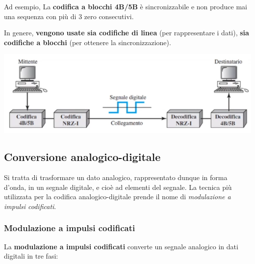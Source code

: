             Ad esempio, La \textbf{codifica a blocchi 4B/5B} è sincronizzabile e non produce mai una sequenza con più di 3 zero consecutivi.
                
            \vspace{3mm}
                
            In genere, \textbf{vengono usate sia codifiche di linea} (per rappresentare i dati), \textbf{sia codifiche a blocchi} (per ottenere la sincronizzazione).
            
            \begin{center}
                \includegraphics[scale=0.45]{images/Utilizzo-Codifiche-di-Linea.png}
            \end{center}
            
    \subsection{Conversione analogico-digitale}
    
        Si tratta di trasformare un dato analogico, rappresentato dunque in forma d'onda, in un segnale digitale, e cioè ad elementi del segnale. La tecnica più utilizzata per la codifica analogico-digitale prende il nome di \textit{modulazione a impulsi codificati}.
        
        \subsubsection{Modulazione a impulsi codificati}
        
            La \textbf{modulazione a impulsi codificati} converte un segnale analogico in dati digitali in tre fasi:
            
